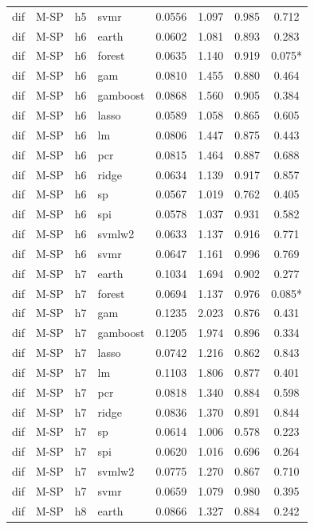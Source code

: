 \begin{ThreePartTable}
\begin{longtable}[t]{llclcccc}
dif & M-SP & h5 & svmr & 0.0556 & 1.097 & 0.985 & 0.712\\
\addlinespace
dif & M-SP & h6 & earth & 0.0602 & 1.081 & 0.893 & 0.283\\
dif & M-SP & h6 & forest & 0.0635 & 1.140 & 0.919 & 0.075*\\
dif & M-SP & h6 & gam & 0.0810 & 1.455 & 0.880 & 0.464\\
dif & M-SP & h6 & gamboost & 0.0868 & 1.560 & 0.905 & 0.384\\
dif & M-SP & h6 & lasso & 0.0589 & 1.058 & 0.865 & 0.605\\
dif & M-SP & h6 & lm & 0.0806 & 1.447 & 0.875 & 0.443\\
dif & M-SP & h6 & pcr & 0.0815 & 1.464 & 0.887 & 0.688\\
dif & M-SP & h6 & ridge & 0.0634 & 1.139 & 0.917 & 0.857\\
dif & M-SP & h6 & sp & 0.0567 & 1.019 & 0.762 & 0.405\\
dif & M-SP & h6 & spi & 0.0578 & 1.037 & 0.931 & 0.582\\
dif & M-SP & h6 & svmlw2 & 0.0633 & 1.137 & 0.916 & 0.771\\
dif & M-SP & h6 & svmr & 0.0647 & 1.161 & 0.996 & 0.769\\
\addlinespace
dif & M-SP & h7 & earth & 0.1034 & 1.694 & 0.902 & 0.277\\
dif & M-SP & h7 & forest & 0.0694 & 1.137 & 0.976 & 0.085*\\
dif & M-SP & h7 & gam & 0.1235 & 2.023 & 0.876 & 0.431\\
dif & M-SP & h7 & gamboost & 0.1205 & 1.974 & 0.896 & 0.334\\
dif & M-SP & h7 & lasso & 0.0742 & 1.216 & 0.862 & 0.843\\
dif & M-SP & h7 & lm & 0.1103 & 1.806 & 0.877 & 0.401\\
dif & M-SP & h7 & pcr & 0.0818 & 1.340 & 0.884 & 0.598\\
dif & M-SP & h7 & ridge & 0.0836 & 1.370 & 0.891 & 0.844\\
dif & M-SP & h7 & sp & 0.0614 & 1.006 & 0.578 & 0.223\\
dif & M-SP & h7 & spi & 0.0620 & 1.016 & 0.696 & 0.264\\
dif & M-SP & h7 & svmlw2 & 0.0775 & 1.270 & 0.867 & 0.710\\
dif & M-SP & h7 & svmr & 0.0659 & 1.079 & 0.980 & 0.395\\
\addlinespace
dif & M-SP & h8 & earth & 0.0866 & 1.327 & 0.884 & 0.242\\

\end{longtable}
\end{ThreePartTable}
